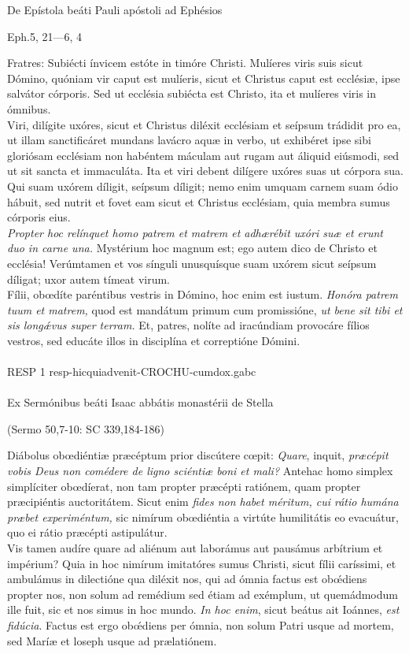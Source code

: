 \documentclass[options]{article}
\begin{document}
	De Epístola beáti Pauli apóstoli ad Ephésios
	\begin{flushright}
	Eph.5, 21—6, 4	
	\end{flushright}
Fratres: Subiécti ínvicem estóte in timóre Christi. Mulíeres viris suis sicut Dómino, quóniam vir caput est mulíeris, sicut et Christus caput est ecclésiæ, ipse salvátor córporis. Sed ut ecclésia subiécta est Christo, ita et mulíeres viris in ómnibus.\\
Viri, dilígite uxóres, sicut et Christus diléxit ecclésiam et seípsum trádidit pro ea, ut illam sanctificáret mundans lavácro aquæ in verbo, ut exhibéret ipse sibi gloriósam ecclésiam non habéntem máculam aut rugam aut áliquid eiúsmodi, sed ut sit sancta et immaculáta. Ita et viri debent dilígere uxóres suas ut córpora sua. Qui suam uxórem díligit, seípsum díligit; nemo enim umquam carnem suam ódio hábuit, sed nutrit et fovet eam sicut et Christus ecclésiam, quia membra sumus córporis eius.\\ 
\emph{Propter hoc relínquet homo patrem et matrem et adhærébit uxóri suæ et erunt duo in carne una.} Mystérium hoc magnum est; ego autem dico de Christo et ecclésia! Verúmtamen et vos sínguli unusquísque suam uxórem sicut seípsum díligat; uxor autem tímeat virum.\\
Fílii, obœdíte paréntibus vestris in Dómino, hoc enim est iustum. \emph{Honóra patrem tuum et matrem,} quod est mandátum primum cum promissióne, \emph{ut bene sit tibi et sis long\'{æ}vus super terram.} Et, patres, nolíte ad iracúndiam provocáre fílios vestros, sed educáte illos in disciplína et correptióne Dómini.\\
\\	
	RESP 1   resp-hicquiadvenit-CROCHU-cumdox.gabc\\
\\	
	Ex Sermónibus beáti Isaac abbátis monastérii de Stella
	\begin{flushright}
		(Sermo 50,7-10: SC 339,184-186)
	\end{flushright}
Diábolus obœdiéntiæ præcéptum prior discútere cœpit: \emph{Quare}, inquit, \emph{præcépit vobis Deus non comédere de ligno sciéntiæ boni et mali?} Antehac homo simplex simplíciter obœdíerat, non tam propter præcépti ratiónem, quam propter præcipiéntis auctoritátem. Sicut enim \emph{fides non habet méritum, cui rátio humána præbet experiméntum,} sic nimírum obœdiéntia a virtúte humilitátis eo evacuátur, quo ei rátio præcépti astipulátur.\\
Vis tamen audíre quare ad aliénum aut laborámus aut pausámus arbítrium et impérium? Quia in hoc nimírum imitatóres sumus Christi, sicut fílii caríssimi, et ambulámus in dilectióne qua diléxit nos, qui ad ómnia factus est ob\'{œ}diens propter nos, non solum ad remédium sed étiam ad exémplum, ut quemádmodum ille fuit, sic et nos simus in hoc mundo. \emph{In hoc enim}, sicut beátus ait Ioánnes, \emph{est fidúcia}. Factus est ergo ob\'{œ}diens per ómnia, non solum Patri usque ad mortem, sed Maríæ et loseph usque ad prælatiónem.\\
\end{document}

